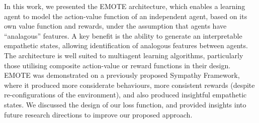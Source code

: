 In this work, we presented the EMOTE architecture, which enables a learning agent to model the action-value function of an independent agent, based on its own value function and rewards, under the assumption that agents have ``analagous'' features. A key benefit is the ability to generate an interpretable empathetic states, allowing identification of analogous features between agents. 
The architecture is well suited to multiagent learning algorithms, particularly those utilising composite action-value or reward functions in their design. %
EMOTE was demonstrated on a previously proposed Sympathy Framework, where it produced more considerate behaviours, more consistent rewards (despite re-configurations of the environment), and also produced insightful empathetic states. We discussed the design of our loss function, and provided insights into future research directions to improve our proposed approach.

